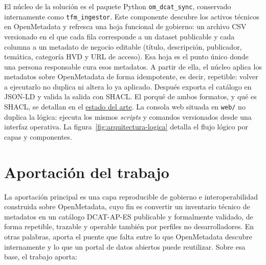 El núcleo de la solución es el paquete Python \texttt{om\_dcat\_sync}, conservado internamente como \texttt{tfm\_ingestor}. Este componente descubre los activos técnicos en OpenMetadata y refresca una hoja funcional de gobierno: un archivo CSV versionado en el que cada fila corresponde a un dataset publicable y cada columna a un metadato de negocio editable (título, descripción, publicador, temática, categoría HVD y URL de acceso). Esa hoja es el punto único donde una persona responsable cura esos metadatos. A partir de ella, el núcleo aplica los metadatos sobre OpenMetadata de forma idempotente, es decir, repetible: volver a ejecutarlo no duplica ni altera lo ya aplicado. Después exporta el catálogo en JSON-LD y valida la salida con SHACL. El porqué de ambos formatos, y qué es SHACL, se detallan en el \hyperref[cap:estado-arte]{estado del arte}. La consola web situada en \texttt{web/} no duplica la lógica: ejecuta los mismos \emph{scripts} y comandos versionados desde una interfaz operativa. La figura~\ref{fig:arquitectura-logica} detalla el flujo lógico por capas y componentes.


\section{Aportación del trabajo}

La aportación principal es una capa reproducible de gobierno e interoperabilidad construida sobre OpenMetadata, cuyo fin es convertir un inventario técnico de metadatos en un catálogo DCAT-AP-ES publicable y formalmente validado, de forma repetible, trazable y operable también por perfiles no desarrolladores. En otras palabras, aporta el puente que falta entre lo que OpenMetadata descubre internamente y lo que un portal de datos abiertos puede reutilizar. Sobre esa base, el trabajo aporta:

